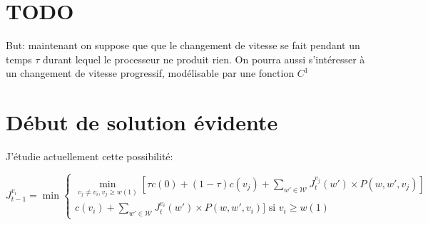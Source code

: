 \documentclass[10pt,a4paper]{article}
\begin{document}
\section{TODO}
But: maintenant on suppose que que le changement de vitesse se fait
pendant un temps $\tau$ durant lequel le processeur ne produit
rien. On pourra aussi s'intéresser à un changement de vitesse
progressif, modélisable par une fonction $C^1$

\section{Début de solution évidente}
J'étudie actuellement cette possibilité:

\begin{equation}
J_{t-1}^{v_i} = \min
  \begin{cases} 
    \min_{v_j\neq v_i, v_j\geq w(1)} [\tau
    c(0)+(1-\tau)c(v_j)+\sum_{w'\in\mathcal{W}}J_t^{v_j}(w')\times
    P(w,w',v_j)]\\
    c(v_i)+\sum_{w'\in\mathcal{W}}J_t^{v_i}(w')\times P(w,w',v_i)]
    \text{ si } v_i\geq w(1)

  \end{cases}
\end{equation}  
\end{document}
